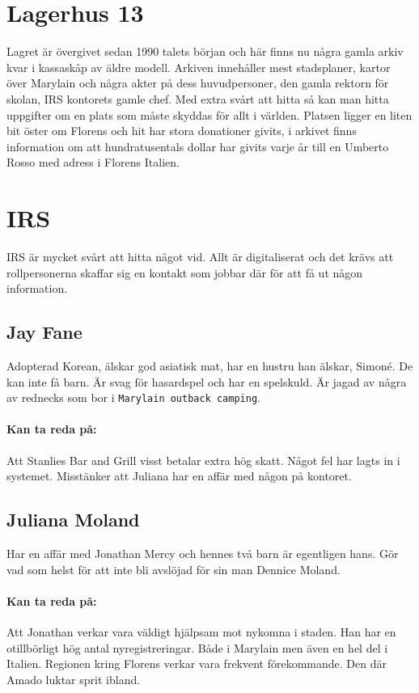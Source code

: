 \documentclass[a5paper,10pt]{report}
\begin{document}
\section{Lagerhus 13}
Lagret är övergivet sedan 1990 talets början och här finns nu några gamla arkiv kvar i kassaskåp av äldre modell. Arkiven innehåller mest stadsplaner, kartor över Marylain och några akter på dess huvudpersoner, den gamla rektorn för skolan, IRS kontorets gamle chef. Med extra svårt att hitta så kan man hitta uppgifter om en plats som måste skyddas för allt i världen. Platsen ligger en liten bit öster om Florens och hit har stora donationer givits, i arkivet finns information om att hundratusentals dollar har givits varje år till en Umberto Rosso  med adress i Florens Italien.
\section{IRS}
IRS är mycket svårt att hitta något vid. Allt är digitaliserat och det krävs att rollpersonerna skaffar sig en kontakt som jobbar där för att få ut någon information.
\subsection{Jay Fane}
Adopterad Korean, älskar god asiatisk mat, har en hustru han älskar, Simoné. De kan inte få barn. Är svag för hasardspel och har en spelskuld. Är jagad av några av rednecks som bor i \texttt{Marylain outback camping}.
\paragraph{Kan ta reda på:} Att Stanlies Bar and Grill visst betalar extra hög skatt. Något fel har lagts in i systemet. Misstänker att Juliana har en affär med någon på kontoret.
\subsection{Juliana Moland}
Har en affär med Jonathan Mercy och hennes två barn är egentligen hans. Gör vad som helst för att inte bli avslöjad för sin man Dennice Moland.
\paragraph{Kan ta reda på:} Att Jonathan verkar vara väldigt hjälpsam mot nykomna i staden. Han har en otillbörligt hög antal nyregistreringar. Både i Marylain men även en hel del i Italien. Regionen kring Florens verkar vara frekvent förekommande. Den där Amado luktar sprit ibland.
\end{document}
